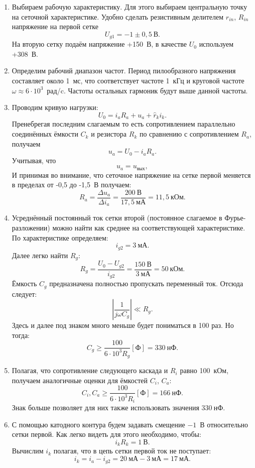 \documentclass[a4paper,14pt]{extarticle}
\begin{document}
	\begin{enumerate}
		\item Выбираем рабочую характеристику. Для этого выбираем центральную точку на сеточной характеристике. Удобно сделать резистивным делителем $r_{in}$, $R_{in}$ напряжение на первой сетке
		\[
			U_{g1} = - 1 \pm 0{,}5~\text{В}.
		\]
		На вторую сетку подаём напряжение +150~В, в качестве $U_0$ используем +308~В.
		\item Определим рабочий диапазон частот. Период пилообразного напряжения составляет около 1~мс, что соответствует частоте 1~кГц и круговой частоте $\omega \approx 6\cdot10^3$~рад/c. Частоты остальных гармоник будут выше данной частоты. 
		\item Проводим кривую нагрузки:
		\[
			U_0 = i_a R_a + u_a + \hat{r}_k i_k.
		\]
		Пренебрегая последним слагаемым то есть сопротивлением параллельно соединённых ёмкости $C_k$ и резистора $R_k$ по сравнению с сопротивлением $R_a$, получаем
		\[
			u_a = U_0 - i_a R_a.
		\]
		Учитывая, что
		\[
			u_a = u_{\text{вых}},
		\]
		И принимая во внимание, что сеточное напряжение на сетке первой меняется в пределах от -0,5 до -1,5~В получаем:
		\[
			R_a = \frac{\Delta u_a}{\Delta i_a} = \frac{200~\text{В}}{17{,}5~\text{мА}} = 11{,}5~\text{кОм}.
		\]
		\item Усреднённый постоянный ток сетки второй (постоянное слагаемое в Фурье-разложении) можно найти как среднее на соответствующей характеристике. По характеристике определяем:
		\[
			i_{g2} = 3~\text{мА}.
		\]
		Далее легко найти $R_g$:
		\[
			R_g = \frac{U_0 - U_{g2}}{i_{g2}} = \frac{150~\text{В}}{3~\text{мА}} = 50~\text{кОм}.
		\]
		Ёмкость $C_g$ предназначена полностью пропускать переменный ток. Отсюда следует:
		\[
			\left|\frac{1}{j\omega C_g}\right| \ll R_g.
		\]
		Здесь и далее под знаком много меньше будет пониматься в 100 раз. Но тогда:
		\[
			C_g \geq \frac{100}{6\cdot10^3 R_g} [\text{Ф}] = 330~\text{нФ}. 
		\]
		\item Полагая, что сопротивление следующего каскада и $R_i$ равно 100~кОм, получаем аналогичные оценки для ёмкостей $C_i$, $C_a$:
		\[
			C_i, C_a \geq \frac{100}{6\cdot10^3 R_i} [\text{Ф}] = 166~\text{нФ}.
		\]
		Знак больше позволяет для них также использовать значения $330~\text{нФ}$.
		\item С помощью катодного контура будем задавать смещение $-1$~В относительно сетки первой. Как легко видеть для этого необходимо, чтобы:
		\[
			i_k R_k = 1~\text{В}.
		\]
		Вычислим $i_k$ полагая, что в цепь сетки первой ток не поступает:
		\[
			i_k = i_a - i_{g2} = 20~\text{мА} - 3~\text{мА} = 17~\text{мА}.
\]
\end{enumerate}
\end{document}
